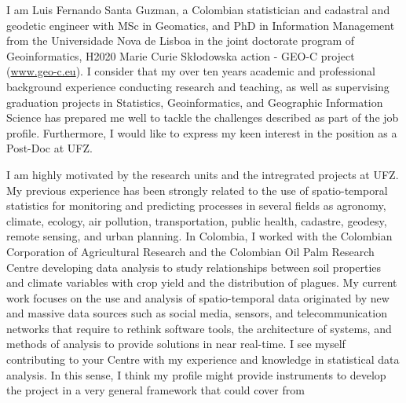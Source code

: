 \documentclass[11pt, a4paper]{awesome-cv}
\begin{document}
\makecvheader[R]


\makelettertitle

\begin{cvletter}
I am Luis Fernando Santa Guzman, a Colombian statistician and cadastral and geodetic engineer with MSc in Geomatics, and PhD in Information Management from the Universidade Nova de Lisboa in the joint doctorate program of Geoinformatics, H2020 Marie Curie Skłodowska action - GEO-C project (\url{www.geo-c.eu}). I consider that my over ten years academic and professional background experience conducting research and teaching, as well as supervising graduation projects in Statistics, Geoinformatics, and Geographic Information Science has prepared me well to tackle the challenges described as part of the job profile. Furthermore, I would like to express my keen interest in the position as a Post-Doc at UFZ.\par
I am highly motivated by the research units and the intregrated projects at UFZ. My previous experience has been strongly related to the use of spatio-temporal statistics for monitoring and predicting processes in several fields as agronomy, climate, ecology, air pollution, transportation, public health, cadastre, geodesy, remote sensing, and urban planning. In Colombia, I worked with the Colombian Corporation of Agricultural Research and the Colombian Oil Palm Research Centre developing data analysis to study relationships between soil properties and climate variables with crop yield and the distribution of plagues. My current work focuses on the use and analysis of spatio-temporal data originated by new and massive data sources such as social media, sensors, and telecommunication networks that require to rethink software tools, the architecture of systems, and methods of analysis to provide solutions in near real-time. I see myself contributing to your Centre with my experience and knowledge in statistical data analysis. In this sense, I think my profile might provide instruments to develop the project in a very general framework that could cover from 

\end{cvletter}
\end{document}
